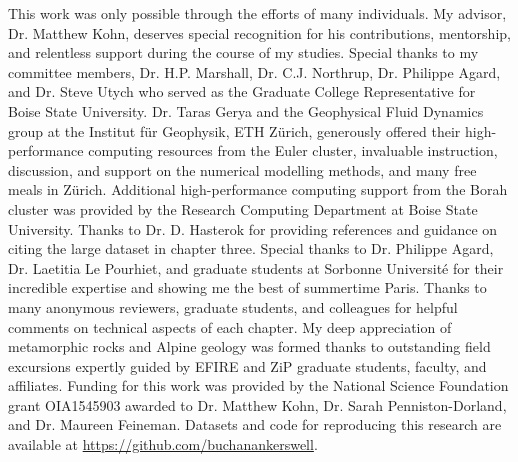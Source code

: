 This work was only possible through the efforts of many individuals. My advisor, Dr. Matthew Kohn, deserves special recognition for his contributions, mentorship, and relentless support during the course of my studies. Special thanks to my committee members, Dr. H.P. Marshall, Dr. C.J. Northrup, Dr. Philippe Agard, and Dr. Steve Utych who served as the Graduate College Representative for Boise State University. Dr. Taras Gerya and the Geophysical Fluid Dynamics group at the Institut für Geophysik, ETH Zürich, generously offered their high-performance computing resources from the Euler cluster, invaluable instruction, discussion, and support on the numerical modelling methods, and many free meals in Zürich. Additional high-performance computing support from the Borah cluster was provided by the Research Computing Department at Boise State University. Thanks to Dr. D. Hasterok for providing references and guidance on citing the large dataset in chapter three. Special thanks to Dr. Philippe Agard, Dr. Laetitia Le Pourhiet, and graduate students at Sorbonne Université for their incredible expertise and showing me the best of summertime Paris. Thanks to many anonymous reviewers, graduate students, and colleagues for helpful comments on technical aspects of each chapter. My deep appreciation of metamorphic rocks and Alpine geology was formed thanks to outstanding field excursions expertly guided by EFIRE and ZiP graduate students, faculty, and affiliates. Funding for this work was provided by the National Science Foundation grant OIA1545903 awarded to Dr. Matthew Kohn, Dr. Sarah Penniston-Dorland, and Dr. Maureen Feineman. Datasets and code for reproducing this research are available at \url{https://github.com/buchanankerswell}.